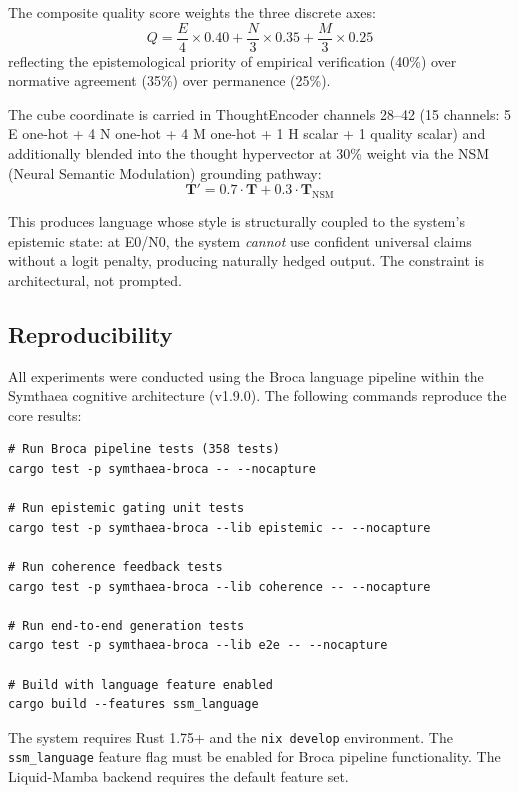 \documentclass[12pt,a4paper]{article}
\begin{document}
The composite quality score weights the three discrete axes:
\begin{equation}
Q = \frac{E}{4} \times 0.40 + \frac{N}{3} \times 0.35 + \frac{M}{3} \times 0.25
\end{equation}
reflecting the epistemological priority of empirical verification (40\%) over normative agreement (35\%) over permanence (25\%).

The cube coordinate is carried in ThoughtEncoder channels 28--42 (15 channels: 5 E one-hot + 4 N one-hot + 4 M one-hot + 1 H scalar + 1 quality scalar) and additionally blended into the thought hypervector at 30\% weight via the NSM (Neural Semantic Modulation) grounding pathway:
\begin{equation}
\mathbf{T}' = 0.7 \cdot \mathbf{T} + 0.3 \cdot \mathbf{T}_{\text{NSM}}
\end{equation}

This produces language whose style is structurally coupled to the system's epistemic state: at E0/N0, the system \emph{cannot} use confident universal claims without a logit penalty, producing naturally hedged output. The constraint is architectural, not prompted.

\subsection*{Reproducibility}

All experiments were conducted using the Broca language pipeline within the Symthaea cognitive architecture (v1.9.0). The following commands reproduce the core results:

\begin{verbatim}
# Run Broca pipeline tests (358 tests)
cargo test -p symthaea-broca -- --nocapture

# Run epistemic gating unit tests
cargo test -p symthaea-broca --lib epistemic -- --nocapture

# Run coherence feedback tests
cargo test -p symthaea-broca --lib coherence -- --nocapture

# Run end-to-end generation tests
cargo test -p symthaea-broca --lib e2e -- --nocapture

# Build with language feature enabled
cargo build --features ssm_language
\end{verbatim}

The system requires Rust 1.75+ and the \texttt{nix develop} environment. The \texttt{ssm\_language} feature flag must be enabled for Broca pipeline functionality. The Liquid-Mamba backend requires the default feature set.
\end{document}
